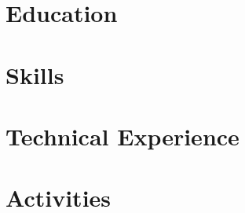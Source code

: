 \documentclass[10pt]{article}
\begin{document}
    \section{Education}
    

    \section{Skills}
    

    \section{Technical Experience}
    

    \section{Activities}
    
\end{document}
